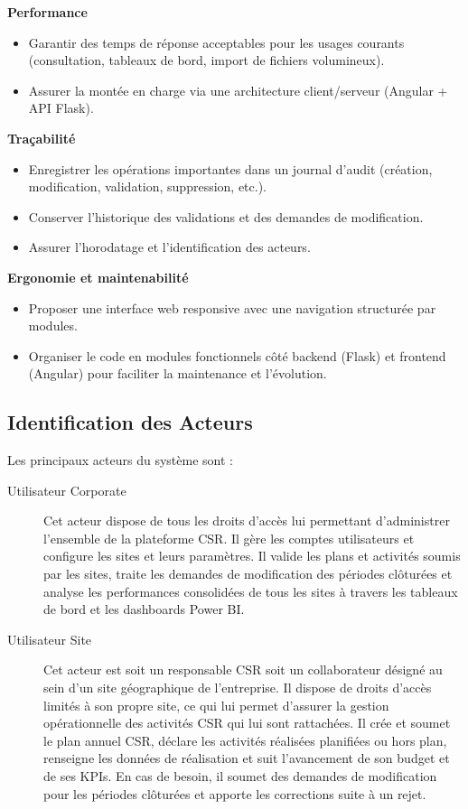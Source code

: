 \textbf{Performance}

\begin{itemize}[label=\textbullet]
  \item Garantir des temps de réponse acceptables pour les usages courants (consultation, tableaux de bord, import de fichiers volumineux).
  \item Assurer la montée en charge via une architecture client/serveur (Angular + API Flask).
\end{itemize}
\newpage
\textbf{Traçabilité}

\begin{itemize}[label=\textbullet]
  \item Enregistrer les opérations importantes dans un journal d’audit (création, modification, validation, suppression, etc.).
  \item Conserver l’historique des validations et des demandes de modification.
  \item Assurer l’horodatage et l’identification des acteurs.
\end{itemize}

\textbf{Ergonomie et maintenabilité}

\begin{itemize}[label=\textbullet]
  \item Proposer une interface web responsive avec une navigation structurée par modules.
  \item Organiser le code en modules fonctionnels côté backend (Flask) et frontend (Angular) pour faciliter la maintenance et l’évolution.
\end{itemize}

\subsection{Identification des Acteurs}

Les principaux acteurs du système sont :

\begin{description}
  \item[Utilisateur Corporate] Cet acteur dispose de tous les droits d'accès lui permettant d'administrer l'ensemble de la plateforme CSR. Il gère les comptes utilisateurs et configure les sites et leurs paramètres. Il valide les plans et activités soumis par les sites, traite les demandes de modification des périodes clôturées et analyse les performances consolidées de tous les sites à travers les tableaux de bord et les dashboards Power BI.
  \item[Utilisateur Site] Cet acteur est soit un responsable CSR soit un collaborateur désigné au sein d'un site géographique de l'entreprise. Il dispose de droits d'accès limités à son propre site, ce qui lui permet d'assurer la gestion opérationnelle des activités CSR qui lui sont rattachées. Il crée et soumet le plan annuel CSR, déclare les activités réalisées planifiées ou hors plan, renseigne les données de réalisation et suit l'avancement de son budget et de ses KPIs. En cas de besoin, il soumet des demandes de modification pour les périodes clôturées et apporte les corrections suite à un rejet.
\end{description}

